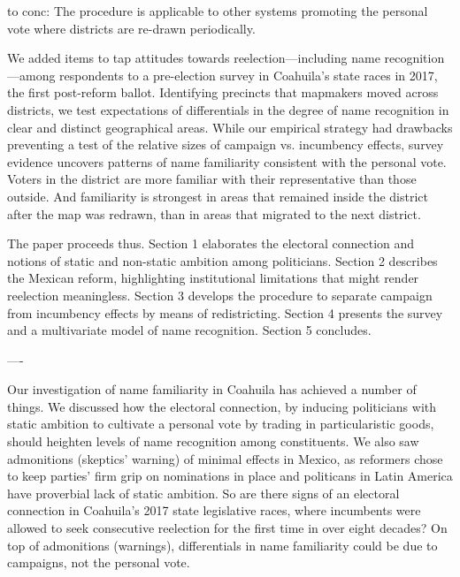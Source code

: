 to conc: The procedure is applicable to other systems promoting the personal vote \citep{carey.shugart.1995} where districts are re-drawn periodically.


We added items to tap attitudes towards reelection---including name recognition \citep[cf.][]{cain.etal.1987}---among respondents to a pre-election survey in Coahuila's state races in 2017, the first post-reform ballot. Identifying precincts that mapmakers moved across districts, we test expectations of differentials in the degree of name recognition in clear and distinct geographical areas. While our empirical strategy had drawbacks preventing a test of the relative sizes of campaign vs. incumbency effects, survey evidence uncovers patterns of name familiarity consistent with the personal vote. Voters in the district are more familiar with their representative than those outside. And familiarity is strongest in areas that remained inside the district after the map was redrawn, than in areas that migrated to the next district.  

The paper proceeds thus. Section 1 elaborates the electoral connection and notions of static and non-static ambition among politicians. Section 2 describes the Mexican reform, highlighting institutional limitations that might render reelection meaningless. Section 3 develops the procedure to separate campaign from incumbency effects by means of redistricting. Section 4 presents the survey and a multivariate model of name recognition. Section 5 concludes.  

----

Our investigation of name familiarity in Coahuila has achieved a number of things. We discussed how the electoral connection, by inducing politicians with static ambition to cultivate a personal vote by trading in particularistic goods, should heighten levels of name recognition among constituents. We also saw admonitions (skeptics' warning) of minimal effects in Mexico, as reformers chose to keep parties' firm grip on nominations in place and politicans in Latin America have proverbial lack of static ambition. So are there signs of an electoral connection in Coahuila's 2017 state legislative races, where incumbents were allowed to seek consecutive reelection for the first time in over eight decades? On top of admonitions (warnings), differentials in name familiarity could be due to campaigns, not the personal vote. 

